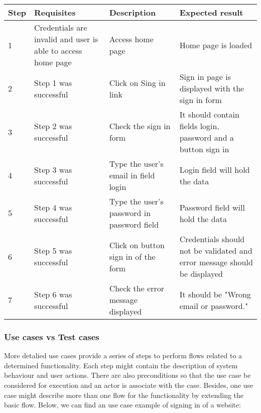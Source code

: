 \begin{center}
\begin{tabular}{| l | p{3cm} | p{5cm} | p{5cm} |}
\hline

Step & Requisites & Description & Expected result \\ \hline

1 & Credentials are invalid and user is able to access home page & Access home page & Home page is loaded\\ \hline

2 & Step 1 was successful & Click on Sing in link & Sign in page is displayed with the sign in form \\ \hline

3 & Step 2 was successful & Check the sign in form & It should contain fields login, password and a button sign in \\ \hline

4 & Step 3 was successful & Type the user's email in field login & Login field will hold the data\\ \hline

5 & Step 4 was successful & Type the user's password in password field & Password field will hold the data \\ \hline

6 & Step 5 was successful & Click on button sign in of the form & Credentials should not be validated and error message should be displayed \\ \hline

7 & Step 6 was successful & Check the error message displayed & It should be "Wrong email or password."\\

\hline
\end{tabular}

\end{center}



\subsubsection{Use cases vs Test cases}

More detalied use cases provide a series of steps to perform flows related to a determined functionality. Each step might contain the description of system behaviour and user actions. There are also preconditions so that the use case be considered for execution and an actor is associate with the case. Besides, one use case might describe more than one flow for the functionality by extending the basic flow. Below, we can find an use case example of signing in of a website:

